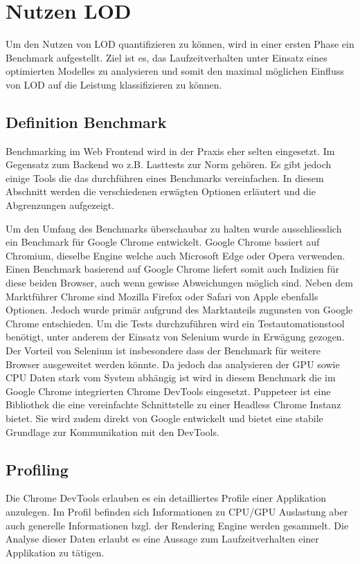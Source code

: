 \section{Nutzen LOD}
Um den Nutzen von LOD quantifizieren zu können, wird in einer ersten Phase ein Benchmark aufgestellt.
Ziel ist es, das Laufzeitverhalten unter Einsatz eines optimierten Modelles zu analysieren und somit den maximal möglichen Einfluss von LOD auf die Leistung klassifizieren zu können.

\subsection{Definition Benchmark}
Benchmarking im Web Frontend wird in der Praxis eher selten eingesetzt. Im Gegensatz zum Backend wo z.B. Lasttests zur Norm gehören.
Es gibt jedoch einige Tools die das durchführen eines Benchmarks vereinfachen. In diesem Abschnitt werden die verschiedenen erwägten Optionen erläutert und die Abgrenzungen aufgezeigt.

Um den Umfang des Benchmarks überschaubar zu halten wurde ausschliesslich ein Benchmark für Google Chrome entwickelt.
Google Chrome basiert auf Chromium, dieselbe Engine welche auch Microsoft Edge oder Opera verwenden.
Einen Benchmark basierend auf Google Chrome liefert somit auch Indizien für diese beiden Browser, auch wenn gewisse Abweichungen möglich sind.
Neben dem Marktführer Chrome sind Mozilla Firefox oder Safari von Apple ebenfalls Optionen. Jedoch wurde primär aufgrund des Marktanteils zugunsten von Google Chrome entschieden.
Um die Tests durchzuführen wird ein Testautomationstool benötigt, unter anderem der Einsatz von Selenium wurde in Erwägung gezogen.
Der Vorteil von Selenium ist insbesondere dass der Benchmark für weitere Browser ausgeweitet werden könnte.
Da jedoch das analysieren der GPU sowie CPU Daten stark vom System abhängig ist wird in diesem Benchmark die im Google Chrome integrierten Chrome DevTools eingesetzt.
Puppeteer ist eine Bibliothek die eine vereinfachte Schnittstelle zu einer Headless Chrome Instanz bietet.
Sie wird zudem direkt von Google entwickelt und bietet eine stabile Grundlage zur Kommunikation mit den DevTools.

\subsection{Profiling}
Die Chrome DevTools erlauben es ein detailliertes Profile einer Applikation anzulegen.
Im Profil befinden sich Informationen zu CPU/GPU Auslastung aber auch generelle Informationen bzgl. der Rendering Engine werden gesammelt.
Die Analyse dieser Daten erlaubt es eine Aussage zum Laufzeitverhalten einer Applikation zu tätigen.

